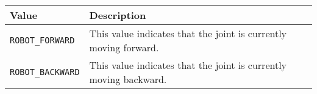 \\
\noindent
\begin{tabular}{p{1.75in}p{4.5in}} \hline 
Value & Description \\
\hline 
\texttt{ROBOT\_FORWARD} & This value indicates that the joint is currently moving forward. \\
\texttt{ROBOT\_BACKWARD}& This value indicates that the joint is currently moving backward.\\
\hline
\end{tabular}\\

